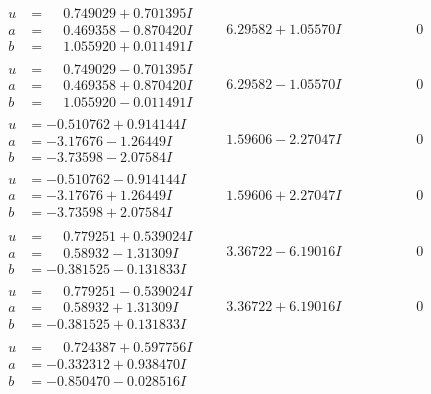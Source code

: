\documentclass[1p]{elsarticle_modified}
\theoremstyle{definition}
\begin{document}
$$\begin{array}{c|c|c}
\begin{aligned}
u &= \phantom{-}0.749029 + 0.701395 I \\
a &= \phantom{-}0.469358 - 0.870420 I \\
b &= \phantom{-}1.055920 + 0.011491 I\end{aligned}
 & \phantom{-}6.29582 + 1.05570 I & \phantom{-0.000000 } 0 \\ \hline\begin{aligned}
u &= \phantom{-}0.749029 - 0.701395 I \\
a &= \phantom{-}0.469358 + 0.870420 I \\
b &= \phantom{-}1.055920 - 0.011491 I\end{aligned}
 & \phantom{-}6.29582 - 1.05570 I & \phantom{-0.000000 } 0 \\ \hline\begin{aligned}
u &= -0.510762 + 0.914144 I \\
a &= -3.17676 - 1.26449 I \\
b &= -3.73598 - 2.07584 I\end{aligned}
 & \phantom{-}1.59606 - 2.27047 I & \phantom{-0.000000 } 0 \\ \hline\begin{aligned}
u &= -0.510762 - 0.914144 I \\
a &= -3.17676 + 1.26449 I \\
b &= -3.73598 + 2.07584 I\end{aligned}
 & \phantom{-}1.59606 + 2.27047 I & \phantom{-0.000000 } 0 \\ \hline\begin{aligned}
u &= \phantom{-}0.779251 + 0.539024 I \\
a &= \phantom{-}0.58932 - 1.31309 I \\
b &= -0.381525 - 0.131833 I\end{aligned}
 & \phantom{-}3.36722 - 6.19016 I & \phantom{-0.000000 } 0 \\ \hline\begin{aligned}
u &= \phantom{-}0.779251 - 0.539024 I \\
a &= \phantom{-}0.58932 + 1.31309 I \\
b &= -0.381525 + 0.131833 I\end{aligned}
 & \phantom{-}3.36722 + 6.19016 I & \phantom{-0.000000 } 0 \\ \hline\begin{aligned}
u &= \phantom{-}0.724387 + 0.597756 I \\
a &= -0.332312 + 0.938470 I \\
b &= -0.850470 - 0.028516 I\end{aligned}

\end{array}$$
\end{document}
